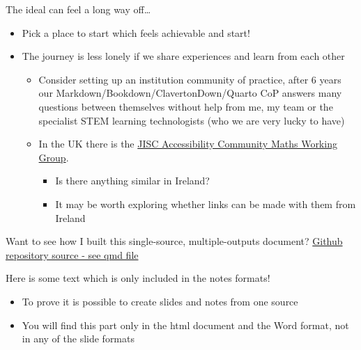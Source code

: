 \documentclass[
  12pt,
  a4-paperpaper,
  DIV=11,
  numbers=noendperiod]{scrartcl}
\providecommand{\tightlist}{%
  \setlength{\itemsep}{0pt}\setlength{\parskip}{0pt}}
\begin{document}
The ideal can feel a long way off\ldots{}

\begin{itemize}
\tightlist
\item
  Pick a place to start which feels achievable and start!
\item
  The journey is less lonely if we share experiences and learn from each
  other

  \begin{itemize}
  \tightlist
  \item
    Consider setting up an institution community of practice, after 6
    years our Markdown/Bookdown/ClavertonDown/Quarto CoP answers many
    questions between themselves without help from me, my team or the
    specialist STEM learning technologists (who we are very lucky to
    have)
  \item
    In the UK there is the
    \href{https://sites.google.com/view/accessible-maths/home}{JISC
    Accessibility Community Maths Working Group}.

    \begin{itemize}
    \tightlist
    \item
      Is there anything similar in Ireland?
    \item
      It may be worth exploring whether links can be made with them from
      Ireland
    \end{itemize}
  \end{itemize}
\end{itemize}

Want to see how I built this single-source, multiple-outputs document?
\href{https://github.com/STEM-Enable/Quick-introduction-to-accessible-maths-2026/}{Github
repository source - see qmd file}

Here is some text which is only included in the notes formats!

\begin{itemize}
\tightlist
\item
  To prove it is possible to create slides and notes from one source
\item
  You will find this part only in the html document and the Word format,
  not in any of the slide formats
\end{itemize}
\end{document}

